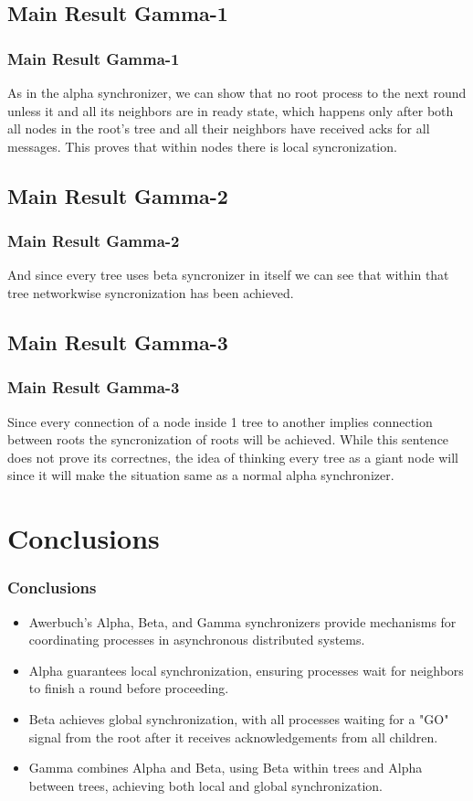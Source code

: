 \documentclass[11pt]{beamer}              %
\begin{document}
\subsection{Main Result Gamma-1}
\begin{frame}
	\frametitle{Main Result Gamma-1}
	As in the alpha synchronizer, we can show that no root process to the next round unless it and all its neighbors are in ready state, which happens only after both all nodes in the root's tree and all their neighbors have received acks for all messages. This proves that within nodes there is local syncronization.
\end{frame}

\subsection{Main Result Gamma-2}
\begin{frame}
	\frametitle{Main Result Gamma-2}
	And since every tree uses beta syncronizer in itself we can see that within that tree networkwise syncronization has been achieved.
	
\end{frame}

\subsection{Main Result Gamma-3}
\begin{frame}
	\frametitle{Main Result Gamma-3}
	Since every connection of a node inside 1 tree to another implies connection between roots the syncronization of roots will be achieved. While this sentence does not prove its correctnes, the idea of thinking every tree as a giant node will since it will make the situation same as a normal alpha synchronizer.
\end{frame}


\section{Conclusions}
\begin{frame}
\frametitle{Conclusions}
\begin{itemize}
	\item Awerbuch's Alpha, Beta, and Gamma synchronizers provide mechanisms for coordinating processes in asynchronous distributed systems.
	\item Alpha guarantees local synchronization, ensuring processes wait for neighbors to finish a round before proceeding.
	\item Beta achieves global synchronization, with all processes waiting for a "GO" signal from the root after it receives acknowledgements from all children.
	\item Gamma combines Alpha and Beta, using Beta within trees and Alpha between trees, achieving both local and global synchronization.
\end{itemize}

\end{frame}
\end{document}
